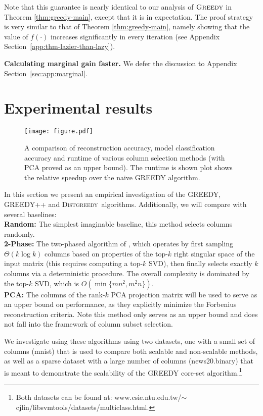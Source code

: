 \documentclass{article}
\newcommand{\greedy}{\textsc{Greedy}}
\newcommand{\distgreedy}{\textsc{Distgreedy}}
\begin{document}
Note that this guarantee is nearly identical to our analysis of $\greedy$ in Theorem \ref{thm:greedy-main}, except that it is in expectation. The proof strategy is very similar to that of Theorem \ref{thm:greedy-main}, namely showing that the value of $f(\cdot)$ increases significantly in every iteration (see Appendix Section~\ref{app:thm-lazier-than-lazy}).

{\bf Calculating marginal gain faster.} We defer the discussion to Appendix Section~\ref{sec:app:marginal}. 


\section{Experimental results}\label{section-6}

\begin{figure*}[t]
\centering
\texttt{[image: figure.pdf]}
\caption{A comparison of reconstruction accuracy, model classification
accuracy and runtime of various column selection methods (with PCA
proved as an upper bound). The runtime is shown plot shows the
relative speedup over the naive GREEDY algorithm.}
\label{fig}
\end{figure*}

In this section we present an empirical investigation of
the GREEDY, GREEDY++ and \distgreedy\ algorithms.
Additionally, we will compare with several baselines:
\\
    {\bf Random:}
    The simplest imaginable baseline, this method selects
    columns randomly. \\
{\bf 2-Phase:}
    The two-phased algorithm of \cite{Boutsidis2}, which
operates by first sampling $\Theta(k \log k)$ columns based on
properties of the top-$k$ right singular space of the input matrix
(this requires computing a top-$k$ SVD), then finally selects exactly
$k$ columns via a deterministic procedure. The overall complexity is
dominated by the top-$k$ SVD, which is $O( \min\{mn^2, m^2n\})$. \\
{\bf PCA:}
    The columns of the rank-$k$ PCA projection matrix will be
used to serve as an upper bound on performance, as they explicitly
minimize the Forbenius reconstruction criteria. Note this method only
serves as an upper bound and does not fall into  the framework of
column subset selection.


We investigate using these algorithms using two datasets, one with a small
set of columns (mnist) that is used to compare both scalable and
non-scalable methods, as well as a sparse dataset with a large number of
columns (news20.binary) that is meant to demonstrate the scalability of the
GREEDY core-set algorithm.\footnote{Both datasets can be
found at:
www.csie.ntu.edu.tw/$\sim$cjlin/libsvmtools/datasets/multiclass.html.}
\end{document}

